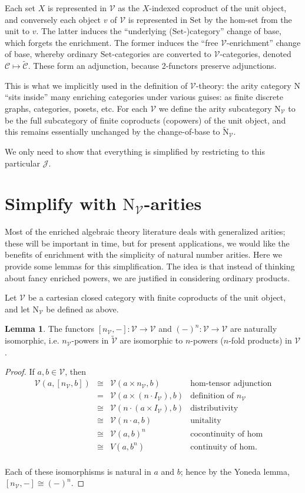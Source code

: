 \documentclass{amsart}
\theoremstyle{definition}
\newtheorem{lemma}[theorem]{Lemma}
\newcommand{\Set}{\mathrm{Set}}
\newcommand{\NN}{\mathrm{N}}
\newcommand{\V}{\mathscr{V}}
\newcommand{\C}{\mathscr{C}}
\newcommand{\J}{\mathscr{J}}
\newcommand{\maps}{\colon}
\begin{document}
Each set $X$ is represented in $\V$ as the $X$-indexed coproduct of the unit object, and conversely each object $v$ of $\V$ is represented in $\Set$ by the hom-set from the unit to $v$. The latter induces the ``underlying ($\Set$-)category'' change of base, which forgets the enrichment. The former induces the ``free $\V$-enrichment'' change of base, whereby ordinary $\Set$-categories are converted to $\V$-categories, denoted $\C \mapsto \tilde{\C}$. These form an adjunction, because 2-functors preserve adjunctions.

This is what we implicitly used in the definition of $\V$-theory: the arity category $\NN$ ``sits inside'' many enriching categories under various guises: as finite discrete graphs, categories, posets, etc. For each $\V$ we define the arity subcategory $\NN_\V$ to be the full subcategory of finite coproducts (copowers) of the unit object, and this remains essentially unchanged by the change-of-base to $\tilde{\NN}_\V$.

We only need to show that everything is simplified by restricting to this particular $\J$.

\section{Simplify with $\NN_\V$-arities}

Most of the enriched algebraic theory literature deals with generalized arities; these will be important in time, but for present applications, we would like the benefits of enrichment with the simplicity of natural number arities. Here we provide some lemmas for this simplification. The idea is that instead of thinking about fancy enriched powers, we are justified in considering ordinary products.

Let $\V$ be a cartesian closed category with finite coproducts of the unit object, and let $\NN_\V$ be defined as above.

\begin{lemma}
	The functors $[n_\V,-]\maps \V\to \V$ and $(-)^n\maps \V\to \V$ are naturally isomorphic, i.e. $n_\V$-powers in $\tilde{\V}$ are isomorphic to $n$-powers ($n$-fold products) in $\V$.
\end{lemma}
\begin{proof}
	If $a,b \in \V$, then
	\[\begin{array}{rcll}
	\V(a,[n_\V,b]) & \cong & \V(a\times n_\V,b) & \text{hom-tensor adjunction}\\
	& = & \V(a\times (n \cdot I_\V),b) & \text{definition of } n_\V\\
	& \cong & \V(n \cdot (a\times I_\V),b) & \text{distributivity}\\
	& \cong & \V(n\cdot a,b) & \text{unitality}\\
	& \cong & \V(a,b)^n & \text{cocontinuity of hom}\\
	& \cong & V(a,b^n) & \text{continuity of hom}.\\
	\end{array}\]

Each of these isomorphisms is natural in $a$ and $b$; hence by the Yoneda lemma, $[n_\V,-] \cong (-)^n$.
\end{proof}
\end{document}
